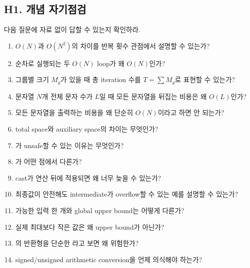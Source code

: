 \subsection{H1. 개념 자기점검}
다음 질문에 자료 없이 답할 수 있는지 확인하라.
\begin{enumerate}
  \item $O(N)$과 $O(N^2)$의 차이를 반복 횟수 관점에서 설명할 수 있는가?
  \item 순차로 실행되는 두 $O(N)$ loop가 왜 $O(N)$인가?
  \item 그룹별 크기 $M_g$가 있을 때 총 iteration 수를 $T=\sum M_g$로 표현할 수 있는가?
  \item 문자열 $N$개 전체 문자 수가 $L$일 때 모든 문자열을 뒤집는 비용은 왜 $O(L)$인가?
  \item 모든 문자열을 출력하는 비용을 왜 단순히 $O(N)$이라고 하면 안 되는가?
  \item total space와 auxiliary space의 차이는 무엇인가?
  \item {}가 unsafe할 수 있는 이유는 무엇인가?
  \item {}가 어떤 점에서 다른가?
  \item cast가 연산 뒤에 적용되면 왜 너무 늦을 수 있는가?
  \item 최종값이 안전해도 intermediate가 overflow할 수 있는 예를 설명할 수 있는가?
  \item 가능한 입력 한 개와 global upper bound는 어떻게 다른가?
  \item 실제 최대보다 작은 값은 왜 upper bound가 아닌가?
  \item {}의 반환형을 단순한 라고 보면 왜 위험한가?
  \item signed/unsigned arithmetic conversion을 언제 의식해야 하는가?
\end{enumerate}

